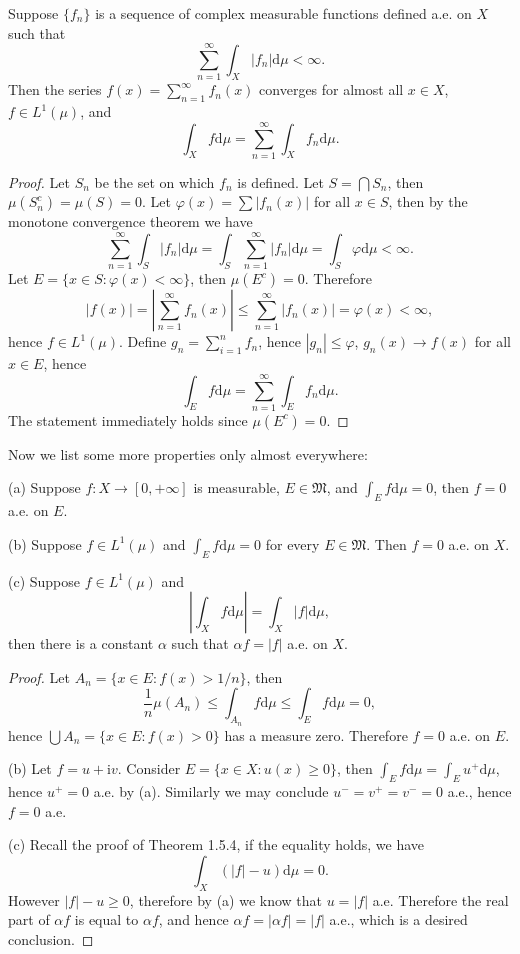 \begin{theorem}
Suppose $\{f_n\}$ is a sequence of complex measurable functions defined a.e. on $X$ such that 
$$\sum_{n=1}^\infty\int_X|f_n|\mathrm{d}\mu<\infty.$$
Then the series $f(x)=\sum_{n=1}^\infty f_n(x)$ converges for almost all $x\in X$, $f\in L^1(\mu)$, and 
$$\int_Xf\mathrm{d}\mu=\sum_{n=1}^\infty\int_Xf_n\mathrm{d}\mu.$$
\end{theorem}
\begin{proof}
Let $S_n$ be the set on which $f_n$ is defined. Let $S=\bigcap S_n$, then $\mu(S_n^c)=\mu(S)=0$. Let $\varphi(x)=\sum|f_n(x)|$ for all $x\in S$, then by the monotone convergence theorem we have 
$$
\sum_{n=1}^{\infty}{\int_S{\left| f_n \right|\mathrm{d}\mu}}=\int_S{\sum_{n=1}^{\infty}{\left| f_n \right|}\mathrm{d}\mu}=\int_S{\varphi \mathrm{d}\mu}<\infty .
$$
Let $E=\{x\in S:\varphi(x)<\infty\}$, then $\mu(E^c)=0$. Therefore 
$$
\left| f\left( x \right) \right|=\left| \sum_{n=1}^{\infty}{f_n\left( x \right)} \right|\le \sum_{n=1}^{\infty}{\left| f_n\left( x \right) \right|}=\varphi \left( x \right) <\infty ,
$$
hence $f\in L^1(\mu)$. Define $g_n=\sum_{i=1}^nf_n$, hence $|g_n|\le\varphi$, $g_n(x)\to f(x)$ for all $x\in E$, hence 
$$\int_Ef\mathrm{d}\mu=\sum_{n=1}^\infty\int_Ef_n\mathrm{d}\mu.$$
The statement immediately holds since $\mu(E^c)=0$.
\end{proof}
Now we list some more properties only almost everywhere:
\begin{proposition}
(a) Suppose $f:X\to[0,+\infty]$ is measurable, $E\in\mathfrak{M}$, and $\int_Ef\mathrm{d}\mu=0$, then $f=0$ a.e. on $E$.\par
(b) Suppose $f\in L^1(\mu)$ and $\int_Ef\mathrm{d}\mu=0$ for every $E\in\mathfrak{M}$. Then $f=0$ a.e. on $X$.\par
(c) Suppose $f\in L^1(\mu)$ and 
$$\left|\int_Xf\mathrm{d}\mu\right|=\int_X|f|\mathrm{d}\mu,$$
then there is a constant $\alpha$ such that $\alpha f=|f|$ a.e. on $X$.
\end{proposition}
\begin{proof}
Let $A_n=\{x\in E:f(x)>1/n\}$, then 
$$
\frac{1}{n}\mu \left( A_n \right) \le \int_{A_n}{f\mathrm{d}\mu}\le \int_E{f\mathrm{d}\mu}=0,
$$
hence $\bigcup A_n=\{x\in E:f(x)>0\}$ has a measure zero. Therefore $f=0$ a.e. on $E$.\par
(b) Let $f=u+\mathrm{i}v$. Consider $E=\{x\in X:u(x)\ge 0\}$, then $\int_Ef\mathrm{d}\mu=\int_Eu^+\mathrm{d}\mu$, hence $u^+=0$ a.e. by (a). Similarly we may conclude $u^-=v^+=v^-=0$ a.e., hence $f=0$ a.e.\par
(c) Recall the proof of Theorem 1.5.4, if the equality holds, we have 
$$\int_X(|f|-u)\mathrm{d}\mu=0.$$
However $|f|-u\ge 0$, therefore by (a) we know that $u=|f|$ a.e. Therefore the real part of $\alpha f$ is equal to $\alpha f$, and hence $\alpha f=|\alpha f|=|f|$ a.e., which is a desired conclusion.
\end{proof}
